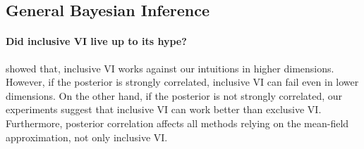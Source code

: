 \subsection{General Bayesian Inference}

\paragraph{Did inclusive VI live up to its hype?}
\citet{dhaka_challenges_2021} showed that, inclusive VI works against our intuitions in higher dimensions.
However, if the posterior is strongly correlated, inclusive VI can fail even in lower dimensions.
On the other hand, if the posterior is not strongly correlated, our experiments suggest that inclusive VI can work better than exclusive VI.
Furthermore, posterior correlation affects all methods relying on the mean-field approximation, not only inclusive VI.


